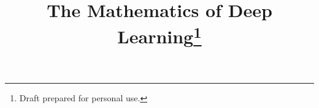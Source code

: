 \documentclass[modern]{aastex61}
\begin{document}
\title{The Mathematics of Deep Learning\footnote{Draft prepared for personal use.}}


\end{document}
